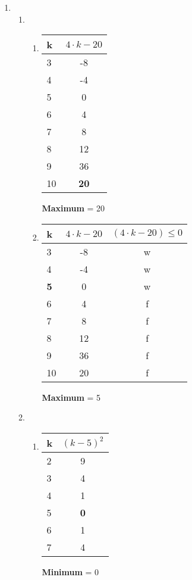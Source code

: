 \documentclass[a4paper]{article}
\begin{document}
\begin{enumerate}
		\item
		\begin{enumerate}
			\item
			\begin{enumerate}
				\item
				\begin{center}
					\begin{tabular}{|l|c|}
						\firsthline
							k & $4 \cdot k - 20$ \\
						\hline
							3 & -8 \\
							4 & -4 \\
							5 & 0 \\
							6 & 4 \\
							7 & 8 \\
							8 & 12 \\
							9 & 36 \\
							10 & \textbf{20} \\
						\hline
					\end{tabular}
					\newline
					\textbf{Maximum} = 20
				\end{center}
			
				\item
				\begin{center}
					\begin{tabular}{|l|c|c|}
						\firsthline
							k & $4 \cdot k - 20$ & $(4 \cdot k - 20) \leq 0$ \\
						\hline
							3 & -8 & w \\
							4 & -4 & w \\
							\textbf{5} & 0 & w \\
							6 & 4 & f \\
							7 & 8 & f \\
							8 & 12 & f \\
							9 & 36 & f \\
							10 & 20 & f \\
						\hline
					\end{tabular}
					\newline
					\textbf{Maximum} = 5
				\end{center}
			\end{enumerate}
			\clearpage
			
			\item
			\begin{enumerate}
				\item
				\begin{center}
					\begin{tabular}{|l|c|}
						\firsthline
							k & $(k - 5)^{2}$ \\
						\hline
							2 & 9 \\
							3 & 4 \\
							4 & 1 \\
							5 & \textbf{0} \\
							6 & 1 \\
							7 & 4 \\
						\hline
					\end{tabular}
					\newline
					\textbf{Minimum} = 0
				\end{center}
				

\end{enumerate}
\end{enumerate}
\end{enumerate}
\end{document}
